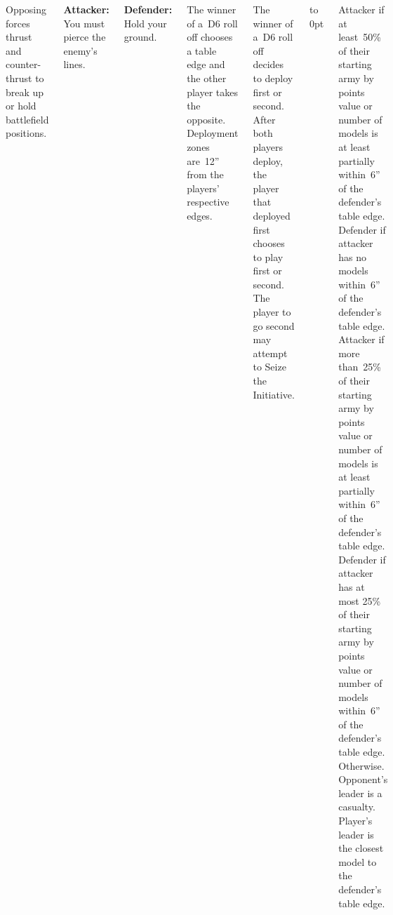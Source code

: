 
\begin{columns}

  Opposing forces thrust and counter-thrust to break up or hold
  battlefield positions.

{\bf Attacker:} You must pierce the enemy's lines.

{\bf Defender:} Hold your ground.

%

The winner of a~D6 roll off chooses a table edge and the other player
takes the opposite.  Deployment zones are~12'' from the players'
respective edges.

%

The winner of a~D6 roll off decides to deploy first or second.  After
both players deploy, the player that deployed first chooses to play
first or second.  The player to go second may attempt to Seize the
Initiative.

\vfill
\vbox to 0pt{}

\columnbreak

\scoringbox%
{Attacker if at least~50\% of their starting army by points value or
  number of models is at least partially within~6'' of the defender's
  table edge.  Defender if attacker has no models within~6'' of the
  defender's table edge.}%
{Attacker if more than~25\% of their starting army by points value or
  number of models is at least partially within~6'' of the defender's
  table edge.  Defender if attacker has at most 25\% of their starting
  army by points value or number of models within~6'' of the
  defender's table edge.}%
{Otherwise.}%
{Opponent's leader is a casualty.}%
{Player's leader is the closest model to the defender's table edge.}

\end{columns}
